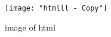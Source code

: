 \documentclass{article}
\begin{document}
\begin{figure}
	\centering
	\texttt{[image: "htmlll - Copy"]}
	\caption{image of html}
	\label{fig:htmlll---copy}
\end{figure}
\end{document}
